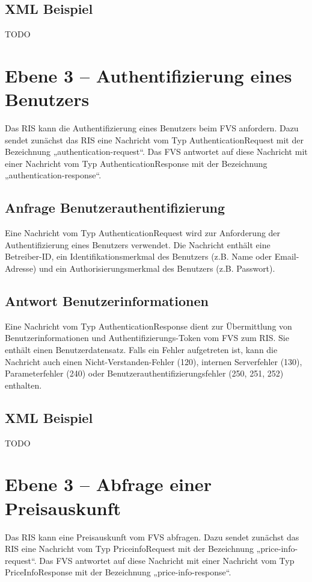 

\subsection{XML Beispiel}
TODO

\section{Ebene 3 -- Authentifizierung eines Benutzers}
Das RIS kann die Authentifizierung eines Benutzers beim FVS anfordern. Dazu sendet zunächst das RIS eine Nachricht vom Typ AuthenticationRequest mit der Bezeichnung „authentication-request“. Das FVS antwortet auf diese Nachricht mit einer Nachricht vom Typ AuthenticationResponse mit der Bezeichnung „authentication-response“.



\subsection{Anfrage Benutzerauthentifizierung}
Eine Nachricht vom Typ AuthenticationRequest wird zur Anforderung der Authentifizierung eines Benutzers verwendet. Die Nachricht enthält eine Betreiber-ID, ein Identifikationsmerkmal des Benutzers (z.B. Name oder Email-Adresse) und ein Authorisierungsmerkmal des Benutzers (z.B. Passwort).



\subsection{Antwort Benutzerinformationen}
Eine Nachricht vom Typ AuthenticationResponse dient zur Übermittlung von Benutzerinformationen und Authentifizierungs-Token vom FVS zum RIS. Sie enthält einen Benutzerdatensatz. Falls ein Fehler aufgetreten ist, kann die Nachricht auch einen Nicht-Verstanden-Fehler (120), internen Serverfehler (130), Parameterfehler (240) oder Benutzerauthentifizierungsfehler (250, 251, 252) enthalten.



\subsection{XML Beispiel}
TODO

\section{Ebene 3 -- Abfrage einer Preisauskunft}
Das RIS kann eine Preisauskunft vom FVS abfragen. Dazu sendet zunächst das RIS eine Nachricht vom Typ PriceinfoRequest mit der Bezeichnung „price-info-request“. Das FVS antwortet auf diese Nachricht mit einer Nachricht vom Typ PriceInfoResponse mit der Bezeichnung „price-info-response“.

